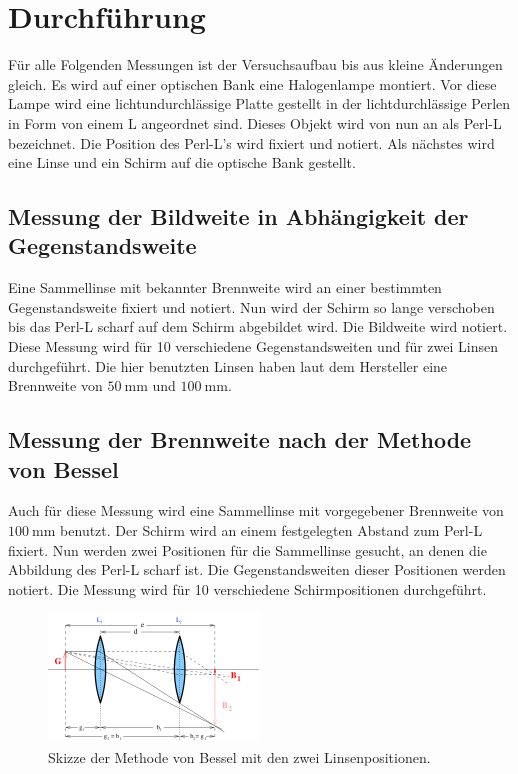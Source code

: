 \section{Durchführung}
\label{sec:Durchführung}

Für alle Folgenden Messungen ist der Versuchsaufbau bis aus kleine Änderungen gleich.
Es wird auf einer optischen Bank eine Halogenlampe montiert.
Vor diese Lampe wird eine lichtundurchlässige Platte gestellt in der lichtdurchlässige Perlen in Form von einem L angeordnet sind.
Dieses Objekt wird von nun an als Perl-L bezeichnet.
Die Position des Perl-L's wird fixiert und notiert.
Als nächstes wird eine Linse und ein Schirm auf die optische Bank gestellt.

\subsection{Messung der Bildweite in Abhängigkeit der Gegenstandsweite}
\label{ssec:Durchführung_brennweite}

Eine Sammellinse mit bekannter Brennweite wird an einer bestimmten Gegenstandsweite fixiert und notiert.
Nun wird der Schirm so lange verschoben bis das Perl-L scharf auf dem Schirm abgebildet wird.
Die Bildweite wird notiert.
Diese Messung wird für 10 verschiedene Gegenstandsweiten und für zwei Linsen durchgeführt.
Die hier benutzten Linsen haben laut dem Hersteller eine Brennweite von $\SI{50}{\milli\metre}$ und $\SI{100}{\milli\metre}$.

\subsection{Messung der Brennweite nach der Methode von Bessel}
\label{ssec:Durchführung_bessel}

Auch für diese Messung wird eine Sammellinse mit vorgegebener Brennweite von $\SI{100}{\milli\metre}$ benutzt.
Der Schirm wird an einem festgelegten Abstand zum Perl-L fixiert.
Nun werden zwei Positionen für die Sammellinse gesucht, an denen die Abbildung des Perl-L scharf ist.
Die Gegenstandsweiten dieser Positionen werden notiert.
Die Messung wird für 10 verschiedene Schirmpositionen durchgeführt.

\begin{figure}
    \centering
    \includegraphics[width=0.5\textwidth]{images/skizze_bessel.png}
    \caption{Skizze der Methode von Bessel mit den zwei Linsenpositionen.\cite{V408}}
    \label{fig:skizze_bessel}
\end{figure}